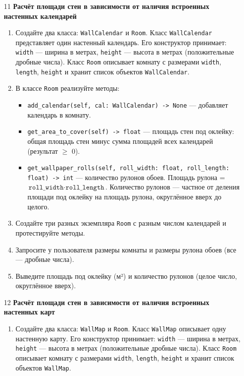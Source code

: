 \begin{enumerate}
\item[11] \textbf{Расчёт площади стен в зависимости от наличия встроенных настенных календарей}
\begin{enumerate}
    \item Создайте два класса: \texttt{WallCalendar} и \texttt{Room}.  
    Класс \texttt{WallCalendar} представляет один настенный календарь. Его конструктор принимает:  
    \texttt{width} — ширина в метрах,  
    \texttt{height} — высота в метрах (положительные дробные числа).  
    Класс \texttt{Room} описывает комнату с размерами \texttt{width}, \texttt{length}, \texttt{height} и хранит список объектов \texttt{WallCalendar}.

    \item В классе \texttt{Room} реализуйте методы:  
    \begin{itemize}
        \item \texttt{add\_calendar(self, cal: WallCalendar) -> None} — добавляет календарь в комнату.
        \item \texttt{get\_area\_to\_cover(self) -> float} — площадь стен под оклейку: общая площадь стен минус сумма площадей всех календарей (результат $\geqslant$ 0).
        \item \texttt{get\_wallpaper\_rolls(self, roll\_width: float, roll\_length: float) -> int} — количество рулонов обоев. Площадь рулона = \(\texttt{roll\_width} \cdot \texttt{roll\_length}\). Количество рулонов — частное от деления площади под оклейку на площадь рулона, округлённое вверх до целого.
    \end{itemize}

    \item Создайте три разных экземпляра \texttt{Room} с разным числом календарей и протестируйте методы.

    \item Запросите у пользователя размеры комнаты и размеры рулона обоев (все — дробные числа).

    \item Выведите площадь под оклейку (м²) и количество рулонов (целое число, округлённое вверх).
\end{enumerate}

\item[12] \textbf{Расчёт площади стен в зависимости от наличия встроенных настенных карт}
\begin{enumerate}
    \item Создайте два класса: \texttt{WallMap} и \texttt{Room}.  
    Класс \texttt{WallMap} описывает одну настенную карту. Его конструктор принимает:  
    \texttt{width} — ширина в метрах,  
    \texttt{height} — высота в метрах (положительные дробные числа).  
    Класс \texttt{Room} описывает комнату с размерами \texttt{width}, \texttt{length}, \texttt{height} и хранит список объектов \texttt{WallMap}.


\end{enumerate}
\end{enumerate}
